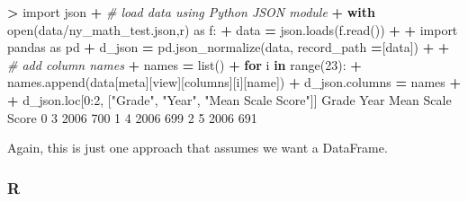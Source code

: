 \documentclass[
]{book}
\newenvironment{Shaded}{\begin{snugshade}}{\end{snugshade}}
\newcommand{\BuiltInTok}[1]{#1}
\newcommand{\CommentTok}[1]{\textcolor[rgb]{0.56,0.35,0.01}{\textit{#1}}}
\newcommand{\ControlFlowTok}[1]{\textcolor[rgb]{0.13,0.29,0.53}{\textbf{#1}}}
\newcommand{\DecValTok}[1]{\textcolor[rgb]{0.00,0.00,0.81}{#1}}
\newcommand{\ImportTok}[1]{#1}
\newcommand{\KeywordTok}[1]{\textcolor[rgb]{0.13,0.29,0.53}{\textbf{#1}}}
\newcommand{\NormalTok}[1]{#1}
\newcommand{\OperatorTok}[1]{\textcolor[rgb]{0.81,0.36,0.00}{\textbf{#1}}}
\newcommand{\StringTok}[1]{\textcolor[rgb]{0.31,0.60,0.02}{#1}}
\begin{document}
\begin{Shaded}
\begin{Highlighting}[]
\OperatorTok{\textgreater{}} \ImportTok{import}\NormalTok{ json}
\OperatorTok{+} \CommentTok{\# load data using Python JSON module}
\OperatorTok{+} \ControlFlowTok{with} \BuiltInTok{open}\NormalTok{(}\StringTok{\textquotesingle{}data/ny\_math\_test.json\textquotesingle{}}\NormalTok{,}\StringTok{\textquotesingle{}r\textquotesingle{}}\NormalTok{) }\ImportTok{as}\NormalTok{ f:}
\OperatorTok{+}\NormalTok{     data }\OperatorTok{=}\NormalTok{ json.loads(f.read())}
\OperatorTok{+} 
\OperatorTok{+} \ImportTok{import}\NormalTok{ pandas }\ImportTok{as}\NormalTok{ pd  }
\OperatorTok{+}\NormalTok{ d\_json }\OperatorTok{=}\NormalTok{ pd.json\_normalize(data, record\_path }\OperatorTok{=}\NormalTok{[}\StringTok{\textquotesingle{}data\textquotesingle{}}\NormalTok{])}
\OperatorTok{+} 
\OperatorTok{+} \CommentTok{\# add column names}
\OperatorTok{+}\NormalTok{ names }\OperatorTok{=} \BuiltInTok{list}\NormalTok{()}
\OperatorTok{+} \ControlFlowTok{for}\NormalTok{ i }\KeywordTok{in} \BuiltInTok{range}\NormalTok{(}\DecValTok{23}\NormalTok{): }
\OperatorTok{+}\NormalTok{   names.append(data[}\StringTok{\textquotesingle{}meta\textquotesingle{}}\NormalTok{][}\StringTok{\textquotesingle{}view\textquotesingle{}}\NormalTok{][}\StringTok{\textquotesingle{}columns\textquotesingle{}}\NormalTok{][i][}\StringTok{\textquotesingle{}name\textquotesingle{}}\NormalTok{])}
\OperatorTok{+}\NormalTok{ d\_json.columns }\OperatorTok{=}\NormalTok{ names}
\OperatorTok{+} 
\OperatorTok{+}\NormalTok{ d\_json.loc[}\DecValTok{0}\NormalTok{:}\DecValTok{2}\NormalTok{, [}\StringTok{"Grade"}\NormalTok{, }\StringTok{"Year"}\NormalTok{, }\StringTok{"Mean Scale Score"}\NormalTok{]]  }
\NormalTok{  Grade  Year Mean Scale Score}
\DecValTok{0}     \DecValTok{3}  \DecValTok{2006}              \DecValTok{700}
\DecValTok{1}     \DecValTok{4}  \DecValTok{2006}              \DecValTok{699}
\DecValTok{2}     \DecValTok{5}  \DecValTok{2006}              \DecValTok{691}
\end{Highlighting}
\end{Shaded}

Again, this is just one approach that assumes we want a DataFrame.

\hypertarget{r-12}{%
\subsubsection*{R}\label{r-12}}
\end{document}
